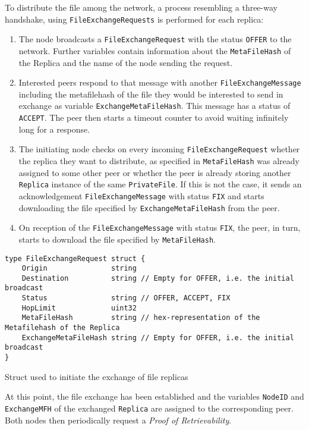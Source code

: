 \documentclass{article}
\begin{document}
To distribute the file among the network, a process resembling a three-way handshake, using \texttt{FileExchangeRequests} is performed for each replica:
\begin{enumerate}
	\item The node broadcasts a \texttt{FileExchangeRequest} with the status \texttt{OFFER} to the network. Further variables contain information about the \texttt{MetaFileHash} of the Replica and the name of the node sending the request.
	\item Interested peers respond to that message with another \texttt{FileExchangeMessage} including the metafilehash of the file they would be interested to send in exchange as variable \texttt{ExchangeMetaFileHash}. This message has a status of \texttt{ACCEPT}. The peer then starts a timeout counter to avoid waiting infinitely long for a response.
	\item The initiating node checks on every incoming \texttt{FileExchangeRequest} whether the replica they want to distribute, as specified in \texttt{MetaFileHash} was already assigned to some other peer or whether the peer is already storing another \texttt{Replica} instance of the same \texttt{PrivateFile}. If this is not the case, it sends an acknowledgement \texttt{FileExchangeMessage} with status \texttt{FIX} and starts downloading the file specified by \texttt{ExchangeMetaFileHash} from the peer. 
	\item On reception of the \texttt{FileExchangeMessage} with status \texttt{FIX}, the peer, in turn, starts to download the file specified by \texttt{MetaFileHash}.
\end{enumerate}

\begin{listing}
\begin{verbatim}
type FileExchangeRequest struct {
	Origin               string 
	Destination          string // Empty for OFFER, i.e. the initial broadcast
	Status               string // OFFER, ACCEPT, FIX
	HopLimit             uint32
	MetaFileHash         string // hex-representation of the Metafilehash of the Replica
	ExchangeMetaFileHash string // Empty for OFFER, i.e. the initial broadcast
}
\end{verbatim}
\caption{Struct used to initiate the exchange of file replicas}
\end{listing}

\noindent 
At this point, the file exchange has been established and the variables \texttt{NodeID} and \texttt{ExchangeMFH} of the exchanged \texttt{Replica} are assigned to the corresponding peer. Both nodes then periodically request a \emph{Proof of Retrievability}.
\\\vspace{0.5em}
\end{document}
